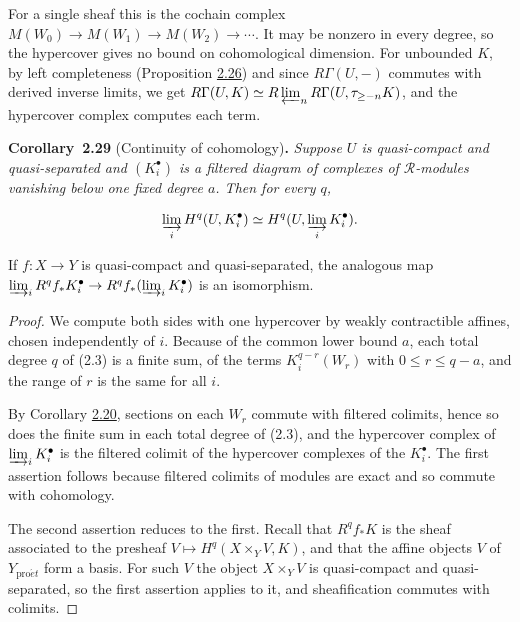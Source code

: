 \documentclass[11pt]{article}
\newenvironment{bpstatement}[2]{\par\addvspace{0.6\baselineskip}\noindent\textbf{#1}#2\textbf{.}\enspace\ignorespaces}
  {\par\addvspace{0.4\baselineskip}}
\newenvironment{bpstatementit}[2]{\begin{bpstatement}{#1}{#2}\itshape\ignorespaces}{\end{bpstatement}}
\begin{document}
\label{bp83}%
For a single sheaf this is the cochain complex \(M(W_0)\to M(W_1)\to M(W_2)\to\cdots\). It may be nonzero in every degree, so the hypercover gives no bound on cohomological dimension. For unbounded \(K\), by left completeness (Proposition \hyperref[bp75]{2.26}) and since \(R\Gamma(U,-)\) commutes with derived inverse limits, we get \(R\Gamma(U,K)\simeq
R\varprojlim_n R\Gamma(U,\tau_{\geq-n}K)\), and the hypercover complex computes each term.

\label{bp84}%
\begin{bpstatementit}{Corollary~2.29}{ (Continuity of cohomology)}
Suppose \(U\) is quasi-compact and quasi-separated and \((K_i^\bullet)\) is a filtered diagram of complexes of \(\mathcal R\)-modules vanishing below one fixed degree \(a\). Then for every \(q\),

\[
\varinjlim_i H^q(U,K_i^\bullet)
\simeq H^q(U,\varinjlim_iK_i^\bullet).
\]

If \(f:X\to Y\) is quasi-compact and quasi-separated, the analogous map \(\varinjlim_iR^qf_*K_i^\bullet\to
R^qf_*(\varinjlim_iK_i^\bullet)\) is an isomorphism.
\end{bpstatementit}

\begin{proof}[{Proof}]\label{bp85}%
We compute both sides with one hypercover by weakly contractible affines, chosen independently of \(i\). Because of the common lower bound \(a\), each total degree \(q\) of (2.3) is a finite sum, of the terms \(K_i^{q-r}(W_r)\) with \(0\leq r\leq q-a\), and the range of \(r\) is the same for all \(i\).

By Corollary \hyperref[bp57]{2.20}, sections on each \(W_r\) commute with filtered colimits, hence so does the finite sum in each total degree of (2.3), and the hypercover complex of \(\varinjlim_iK_i^\bullet\) is the filtered colimit of the hypercover complexes of the \(K_i^\bullet\). The first assertion follows because filtered colimits of modules are exact and so commute with cohomology.

The second assertion reduces to the first. Recall that \(R^qf_*K\) is the sheaf associated to the presheaf \(V\mapsto H^q(X\times_YV,K)\), and that the affine objects \(V\) of \(Y_{\mathrm{pro}\acute{e}t}\) form a basis. For such \(V\) the object \(X\times_YV\) is quasi-compact and quasi-separated, so the first assertion applies to it, and sheafification commutes with colimits.
\end{proof}
\end{document}
